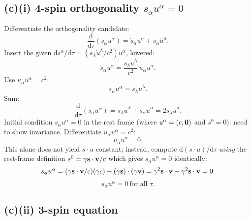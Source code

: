 \documentclass[11pt]{article}
\newcommand{\de}{\mathrm{d}}
\begin{document}
\subsection*{(c)(i) 4-spin orthogonality $s_\alpha u^\alpha=0$}

Differentiate the orthogonality candidate:
\[ \frac{\de}{\de\tau}(s_\alpha u^\alpha) = \dot s_\alpha u^\alpha + s_\alpha\dot u^\alpha. \]
Insert the given $\de s^\alpha/\de\tau=(s_\lambda\dot u^\lambda/c^2)u^\alpha$, lowered:
\[ \dot s_\alpha u^\alpha = \frac{s_\lambda\dot u^\lambda}{c^2}\,u_\alpha u^\alpha. \]
Use $u_\alpha u^\alpha=c^2$:
\[ \dot s_\alpha u^\alpha = s_\lambda\dot u^\lambda. \]
Sum:
\[ \frac{\de}{\de\tau}(s_\alpha u^\alpha) = s_\lambda\dot u^\lambda + s_\alpha\dot u^\alpha = 2 s_\lambda\dot u^\lambda. \]
Initial condition $s_\alpha u^\alpha=0$ in the rest frame (where $u^\alpha=(c,\vb 0)$ and $s^0=0$): need to show invariance. Differentiate $u_\alpha u^\alpha=c^2$:
\[ u_\alpha\dot u^\alpha = 0. \]
This alone does not yield $s\cdot u$ constant; instead, compute $\de(s\cdot u)/\de\tau$ \emph{using} the rest-frame definition $s^0=\gamma\vb s\cdot\vb v/c$ which gives $s_\alpha u^\alpha=0$ identically:
\[ s_\alpha u^\alpha = (\gamma\vb s\cdot\vb v/c)(\gamma c) - (\gamma\vb s)\cdot(\gamma\vb v) = \gamma^2\vb s\cdot\vb v - \gamma^2\vb s\cdot\vb v = 0. \]
\begin{equation}
\boxed{\;s_\alpha u^\alpha = 0\ \text{for all }\tau.\;}
\label{eq:su-orth}
\end{equation}

\subsection*{(c)(ii) 3-spin equation}
\end{document}
